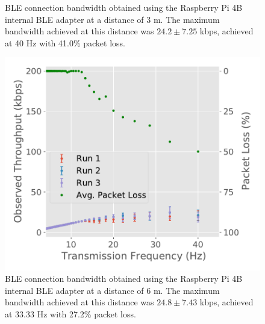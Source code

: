 \begin{figure}[H]
\begin{minipage}{0.45\linewidth}
        \caption[\acs{BLE} connection bandwidth obtained using the ASUS USB-BT500 adapter at a distance of 3 m.]    {\acs{BLE} connection bandwidth obtained using the Raspberry Pi 4B internal \acs{BLE} adapter at a distance of 3 m. The maximum bandwidth achieved at this distance was $24.2 \pm 7.25$ kbps, achieved at 40 Hz with 41.0\% packet loss.}
        \label{fig:ble-bandwidth-hci1-3m}
    \end{minipage}
\end{figure}

\begin{figure}[H]
    \centering
    \begin{minipage}{0.45\linewidth}
        \centering
        \includegraphics[width=\linewidth]{images/ble-bandwidth-hci1-600cm.pdf}
        \caption[\acs{BLE} connection bandwidth obtained using the ASUS USB-BT500 adapter at a distance of 6 m.]{\acs{BLE} connection bandwidth obtained using the Raspberry Pi 4B internal \acs{BLE} adapter at a distance of $6\text{ m}$. The maximum bandwidth achieved at this distance was $24.8 \pm 7.43$ kbps, achieved at 33.33 Hz with 27.2\% packet loss.}
        \label{fig:ble-bandwidth-hci1-6m}
    \end{minipage}
    \hspace{0.05\linewidth}
    \begin{minipage}{0.45\linewidth}
        \centering

\end{minipage}
\end{figure}
